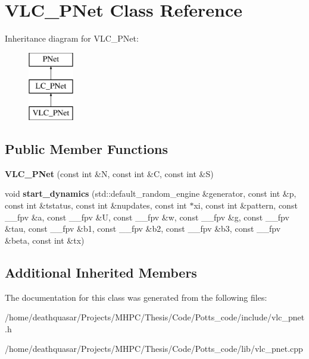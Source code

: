 \hypertarget{class_v_l_c___p_net}{}\section{V\+L\+C\+\_\+\+P\+Net Class Reference}
\label{class_v_l_c___p_net}
Inheritance diagram for V\+L\+C\+\_\+\+P\+Net\+:\begin{figure}[H]
\begin{center}
\leavevmode
\includegraphics[height=3.000000cm]{class_v_l_c___p_net}
\end{center}
\end{figure}
\subsection*{Public Member Functions}
\begin{DoxyCompactItemize}
\item 
\hypertarget{class_v_l_c___p_net_a4c7e1b428ce72022e20ed2c7c05fc599}{}{\bfseries V\+L\+C\+\_\+\+P\+Net} (const int \&N, const int \&C, const int \&S)\label{class_v_l_c___p_net_a4c7e1b428ce72022e20ed2c7c05fc599}

\item 
\hypertarget{class_v_l_c___p_net_a8df456c85a7e6a0319a14c18f014a7d4}{}void {\bfseries start\+\_\+dynamics} (std\+::default\+\_\+random\+\_\+engine \&generator, const int \&p, const int \&tstatus, const int \&nupdates, const int $\ast$xi, const int \&pattern, const \+\_\+\+\_\+fpv \&a, const \+\_\+\+\_\+fpv \&U, const \+\_\+\+\_\+fpv \&w, const \+\_\+\+\_\+fpv \&g, const \+\_\+\+\_\+fpv \&tau, const \+\_\+\+\_\+fpv \&b1, const \+\_\+\+\_\+fpv \&b2, const \+\_\+\+\_\+fpv \&b3, const \+\_\+\+\_\+fpv \&beta, const int \&tx)\label{class_v_l_c___p_net_a8df456c85a7e6a0319a14c18f014a7d4}

\end{DoxyCompactItemize}
\subsection*{Additional Inherited Members}


The documentation for this class was generated from the following files\+:\begin{DoxyCompactItemize}
\item 
/home/deathquasar/\+Projects/\+M\+H\+P\+C/\+Thesis/\+Code/\+Potts\+\_\+code/include/vlc\+\_\+pnet.\+h\item 
/home/deathquasar/\+Projects/\+M\+H\+P\+C/\+Thesis/\+Code/\+Potts\+\_\+code/lib/vlc\+\_\+pnet.\+cpp\end{DoxyCompactItemize}
